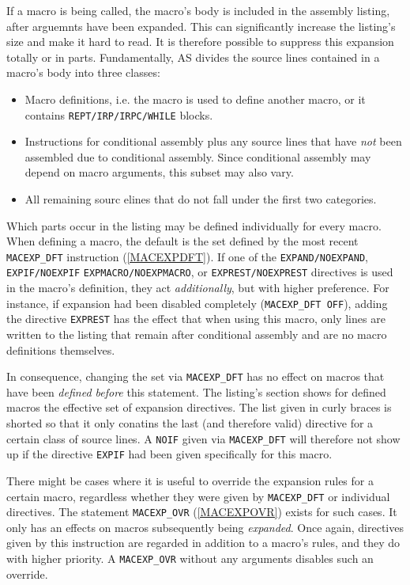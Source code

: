 \documentclass[12pt,twoside]{report}
\newcommand{\tty}[1]{{\tt #1}}
\begin{document}
If a macro is being called, the macro's body is included in the assembly
listing, after arguemnts have been expanded.  This can significantly increase
the listing's size and make it hard to read.  It is therefore possible to
suppress this expansion totally or in parts.  Fundamentally, AS divides
the source lines contained in a macro's body into three classes:
\begin{itemize}
\item{Macro definitions, i.e. the macro is used to define another macro,
      or it contains \tty{REPT/IRP/IRPC/WHILE} blocks.}
\item{Instructions for conditional assembly plus any source lines that have
      {\it not} been assembled due to conditional assembly.  Since conditional
      assembly may depend on macro arguments, this subset may also vary.}
\item{All remaining sourc elines that do not fall under the first two
      categories.}
\end{itemize}
Which parts occur in the listing may be defined individually for every macro.
When defining a macro, the default is the set defined by the most recent
\tty{MACEXP\_DFT} instruction (\ref{MACEXPDFT}).  If one of the \tty{EXPAND/NOEXPAND},
\tty{EXPIF/NOEXPIF} \tty{EXPMACRO/NOEXPMACRO}, or \tty{EXPREST/NOEXPREST}
directives is used in the macro's definition, they act {\em additionally},
but with higher preference.  For instance, if expansion had been disabled
completely (\tty{MACEXP\_DFT OFF}), adding the directive \tty{EXPREST} has the
effect that when using this macro, only lines are written to the listing
that remain after conditional assembly and are no macro definitions themselves.

In consequence, changing the set via \tty{MACEXP\_DFT} has no effect on macros
that have been {\it defined before} this statement.  The listing's section shows
for defined macros the effective set of expansion directives.  The list given
in curly braces is shorted so that it only conatins the last (and therefore
valid) directive for a certain class of source lines.  A \tty{NOIF} given
via \tty{MACEXP\_DFT} will therefore not show up if the directive \tty{EXPIF}
had been given specifically for this macro.

There might be cases where it is useful to override the expansion rules for
a certain macro, regardless whether they were given by \tty{MACEXP\_DFT} or
individual directives.  The statement \tty{MACEXP\_OVR} (\ref{MACEXPOVR})
exists for such cases.  It only has an effects on macros subsequently being
{\it expanded}.  Once again, directives given by this instruction are regarded
in addition to a macro's rules, and they do with higher priority.  A \tty{MACEXP\_OVR}
without any arguments disables such an override.
\end{document}
